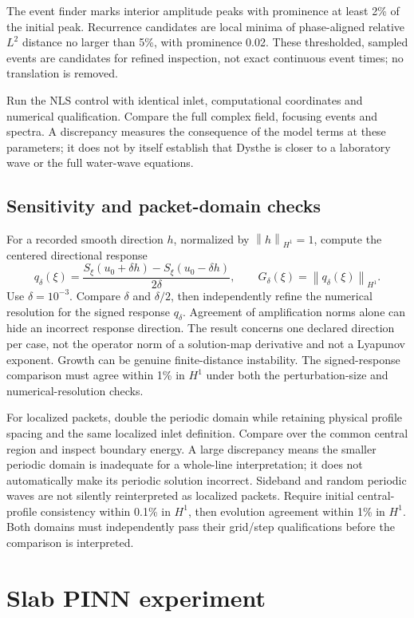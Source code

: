 \documentclass[11pt]{article}
\newcommand{\norm}[1]{\left\lVert #1\right\rVert}
\begin{document}
The event finder marks interior amplitude peaks with prominence at least 2\%
of the initial peak. Recurrence candidates are local minima of phase-aligned
relative \(L^2\) distance no larger than 5\%, with prominence 0.02. These
thresholded, sampled events are candidates for refined inspection, not exact
continuous event times; no translation is removed.

Run the NLS control with identical inlet, computational coordinates and
numerical qualification. Compare the full complex field, focusing events and
spectra. A discrepancy measures the consequence of the model terms at these
parameters; it does not by itself establish that Dysthe is closer to a
laboratory wave or the full water-wave equations.

\subsection{Sensitivity and packet-domain checks}

For a recorded smooth direction \(h\), normalized by
\(\norm{h}_{H^1}=1\), compute the centered directional response
\[
q_\delta(\xi)=\frac{S_\xi(u_0+\delta h)-S_\xi(u_0-\delta h)}{2\delta},
\qquad G_\delta(\xi)=\norm{q_\delta(\xi)}_{H^1}.
\]
Use \(\delta=10^{-3}\). Compare \(\delta\) and \(\delta/2\), then independently refine the numerical
resolution for the signed response \(q_\delta\). Agreement of amplification
norms alone can hide an incorrect response direction. The result concerns one
declared direction per case, not the operator norm of a solution-map derivative
and not a Lyapunov exponent. Growth can be genuine finite-distance instability.
The signed-response comparison must agree within 1\% in \(H^1\) under both
the perturbation-size and numerical-resolution checks.

For localized packets, double the periodic domain while retaining physical
profile spacing and the same localized inlet definition. Compare over the
common central region and inspect boundary energy. A large discrepancy means
the smaller periodic domain is inadequate for a whole-line interpretation;
it does not automatically make its periodic solution incorrect. Sideband and
random periodic waves are not silently reinterpreted as localized packets.
Require initial central-profile consistency within 0.1\% in \(H^1\), then
evolution agreement within 1\% in \(H^1\). Both domains must independently
pass their grid/step qualifications before the comparison is interpreted.

\section{Slab PINN experiment}
\end{document}
